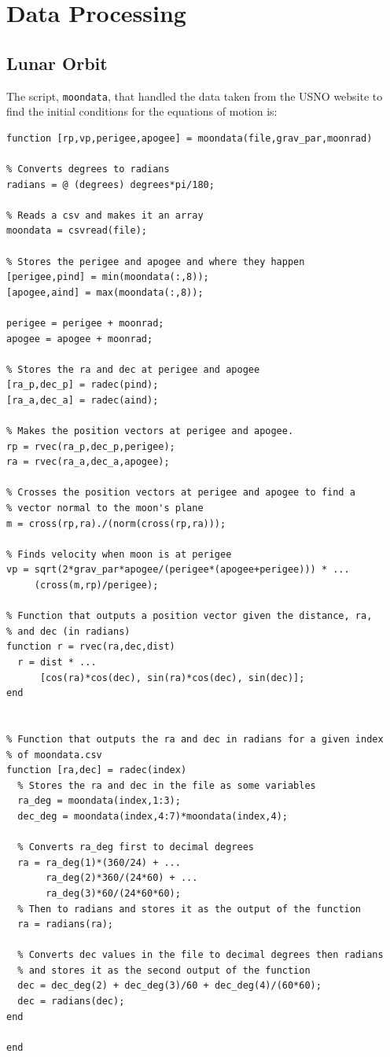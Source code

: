 \documentclass{article}
\begin{document}
\section{Data Processing}
\subsection{Lunar Orbit}\label{sec:moonorb}
The script, \verb[moondata[, that handled the data taken from the USNO website to find
the initial conditions for the equations of motion is:
\begin{verbatim}
function [rp,vp,perigee,apogee] = moondata(file,grav_par,moonrad)

% Converts degrees to radians
radians = @ (degrees) degrees*pi/180;

% Reads a csv and makes it an array
moondata = csvread(file);

% Stores the perigee and apogee and where they happen
[perigee,pind] = min(moondata(:,8));
[apogee,aind] = max(moondata(:,8));

perigee = perigee + moonrad;
apogee = apogee + moonrad;

% Stores the ra and dec at perigee and apogee
[ra_p,dec_p] = radec(pind);
[ra_a,dec_a] = radec(aind);

% Makes the position vectors at perigee and apogee.
rp = rvec(ra_p,dec_p,perigee);
ra = rvec(ra_a,dec_a,apogee);

% Crosses the position vectors at perigee and apogee to find a
% vector normal to the moon's plane
m = cross(rp,ra)./(norm(cross(rp,ra)));

% Finds velocity when moon is at perigee
vp = sqrt(2*grav_par*apogee/(perigee*(apogee+perigee))) * ...
     (cross(m,rp)/perigee);

% Function that outputs a position vector given the distance, ra,
% and dec (in radians)
function r = rvec(ra,dec,dist)
  r = dist * ...
      [cos(ra)*cos(dec), sin(ra)*cos(dec), sin(dec)];
end


% Function that outputs the ra and dec in radians for a given index
% of moondata.csv
function [ra,dec] = radec(index)
  % Stores the ra and dec in the file as some variables
  ra_deg = moondata(index,1:3);
  dec_deg = moondata(index,4:7)*moondata(index,4);  

  % Converts ra_deg first to decimal degrees
  ra = ra_deg(1)*(360/24) + ...
       ra_deg(2)*360/(24*60) + ...
       ra_deg(3)*60/(24*60*60);
  % Then to radians and stores it as the output of the function
  ra = radians(ra);
  
  % Converts dec values in the file to decimal degrees then radians
  % and stores it as the second output of the function
  dec = dec_deg(2) + dec_deg(3)/60 + dec_deg(4)/(60*60);
  dec = radians(dec);
end

end
\end{verbatim}
\end{document}
